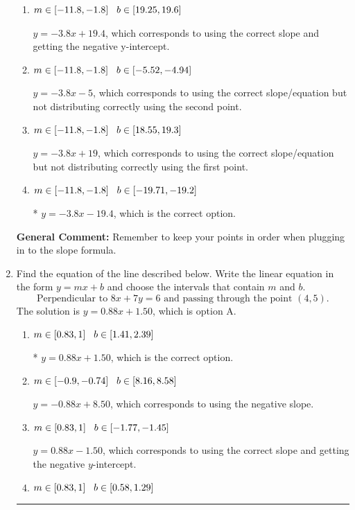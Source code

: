 \documentclass{extbook}[14pt]
\newcommand{\litem}[1]{\item #1

\rule{\textwidth}{0.4pt}}
\begin{document}
\begin{enumerate}
{\begin{enumerate}[label=\Alph*.]
 $y = 3.8x + 3.4$, which corresponds to using the negative slope and the correct equation.
\item \( m \in [-11.8, -1.8] \hspace*{3mm} b \in [19.25, 19.6] \)

 $y = -3.8x + 19.4$, which corresponds to using the correct slope and getting the negative y-intercept.
\item \( m \in [-11.8, -1.8] \hspace*{3mm} b \in [-5.52, -4.94] \)

 $y = -3.8x -5$, which corresponds to using the correct slope/equation but not distributing correctly using the second point.
\item \( m \in [-11.8, -1.8] \hspace*{3mm} b \in [18.55, 19.3] \)

 $y = -3.8x + 19$, which corresponds to using the correct slope/equation but not distributing correctly using the first point.
\item \( m \in [-11.8, -1.8] \hspace*{3mm} b \in [-19.71, -19.2] \)

* $y = -3.8x -19.4$, which is the correct option.
\end{enumerate}

\textbf{General Comment:} Remember to keep your points in order when plugging in to the slope formula.
}
\litem{
Find the equation of the line described below. Write the linear equation in the form $ y=mx+b $ and choose the intervals that contain $m$ and $b$.
\[ \text{Perpendicular to } 8 x + 7 y = 6 \text{ and passing through the point } (4, 5). \]The solution is \( y = 0.88x + 1.50 \), which is option A.\begin{enumerate}[label=\Alph*.]
\item \( m \in [0.83, 1] \hspace*{3mm} b \in [1.41, 2.39] \)

* $y = 0.88x + 1.50$, which is the correct option.
\item \( m \in [-0.9, -0.74] \hspace*{3mm} b \in [8.16, 8.58] \)

 $y = -0.88x + 8.50$, which corresponds to using the negative slope.
\item \( m \in [0.83, 1] \hspace*{3mm} b \in [-1.77, -1.45] \)

 $y = 0.88x - 1.50$, which corresponds to using the correct slope and getting the negative $y$-intercept.
\item \( m \in [0.83, 1] \hspace*{3mm} b \in [0.58, 1.29] \)


\end{enumerate}}
\end{enumerate}
\end{document}

